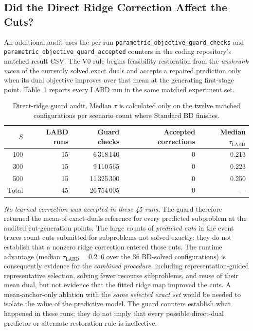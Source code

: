 \subsection{Did the Direct Ridge Correction Affect the Cuts?}\label{app:trace-guard}

An additional audit uses the per-run \texttt{parametric\_objective\_guard\_checks} and \texttt{parametric\_objective\_guard\_accepted} counters in the coding repository's matched result CSV. The V0 rule begins feasibility restoration from the \emph{unshrunk mean} of the currently solved exact duals and accepts a repaired prediction only when its dual objective improves over that mean at the generating first-stage point. Table~\ref{tab:trace-guard} reports every LABD run in the same matched experiment set.

\begin{table}[ht]
\centering
\caption{Direct-ridge guard audit. Median $\tau$ is calculated only on the twelve matched configurations per scenario count where Standard BD finishes.}
\label{tab:trace-guard}
\scriptsize
\setlength{\tabcolsep}{6pt}
\begin{tabular}{r r r r r}
\toprule
$S$ & LABD runs & Guard checks & Accepted corrections & Median $\tau_{\mathrm{LABD}}$\\
\midrule
100 & 15 & 6\,318\,140  & 0 & 0.213\\
300 & 15 & 9\,110\,565  & 0 & 0.223\\
500 & 15 & 11\,325\,300 & 0 & 0.250\\
\midrule
Total & 45 & 26\,754\,005 & 0 & ---\\
\bottomrule
\end{tabular}
\end{table}

\emph{No learned correction was accepted in these 45 runs.} The guard therefore returned the mean-of-exact-duals reference for every predicted subproblem at the audited cut-generation points. The large counts of \emph{predicted cuts} in the event traces count cuts submitted for subproblems not solved exactly; they do not establish that a nonzero ridge correction entered those cuts. The runtime advantage (median $\tau_{\mathrm{LABD}}=0.216$ over the 36 BD-solved configurations) is consequently evidence for the \emph{combined procedure}, including representation-guided representative selection, solving fewer recourse subproblems, and reuse of their mean dual, but not evidence that the fitted ridge map improved the cuts. A mean-anchor-only ablation with the \emph{same selected exact set} would be needed to isolate the value of the predictive model. The guard counters establish what happened in these runs; they do not imply that every possible direct-dual predictor or alternate restoration rule is ineffective.

